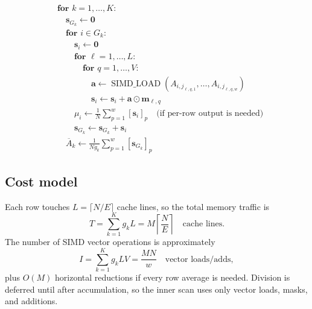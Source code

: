 \documentclass{article}
\begin{document}
\[
\begin{aligned}
&\textbf{for } k=1,\dots,K:\\
&\quad \mathbf{s}_{G_k}\leftarrow \mathbf{0}\\
&\quad \textbf{for } i\in G_k:\\
&\qquad \mathbf{s}_i\leftarrow \mathbf{0}\\
&\qquad \textbf{for } \ell=1,\dots,L:\\
&\qquad\quad \textbf{for } q=1,\dots,V:\\
&\qquad\qquad \mathbf{a}\leftarrow
  \operatorname{SIMD\_LOAD}(A_{i,j_{\ell,q,1}},\dots,A_{i,j_{\ell,q,w}})\\
&\qquad\qquad \mathbf{s}_i\leftarrow
  \mathbf{s}_i+\mathbf{a}\odot\mathbf{m}_{\ell,q}\\
&\qquad \mu_i\leftarrow \frac{1}{N}
  \sum_{p=1}^{w}[\mathbf{s}_i]_p
  \quad\text{(if per-row output is needed)}\\
&\qquad \mathbf{s}_{G_k}\leftarrow \mathbf{s}_{G_k}+\mathbf{s}_i\\
&\quad \overline{A}_k\leftarrow
  \frac{1}{Ng_k}\sum_{p=1}^{w}[\mathbf{s}_{G_k}]_p
\end{aligned}
\]

\subsection*{Cost model}

Each row touches \(L=\lceil N/E\rceil\) cache lines, so the total memory
traffic is
\[
  T
  =
  \sum_{k=1}^{K} g_k L
  =
  M\left\lceil \frac{N}{E}\right\rceil
  \quad\text{cache lines}.
\]
The number of SIMD vector operations is approximately
\[
  I
  =
  \sum_{k=1}^{K} g_k L V
  =
  \frac{MN}{w}
  \quad\text{vector loads/adds},
\]
plus \(O(M)\) horizontal reductions if every row average is needed.
Division is deferred until after accumulation, so the inner scan uses only
vector loads, masks, and additions.
\end{document}
